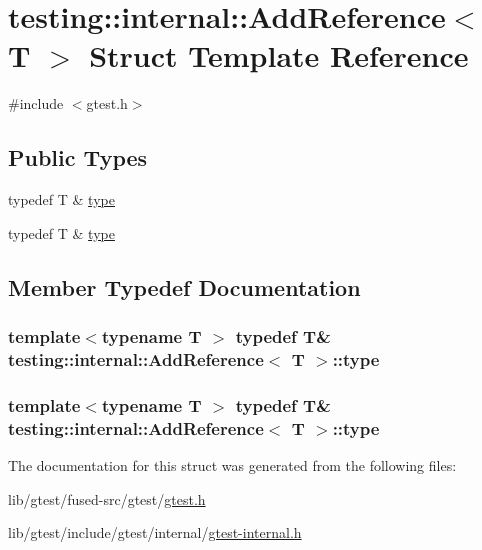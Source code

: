 \hypertarget{structtesting_1_1internal_1_1_add_reference}{\section{testing\-:\-:internal\-:\-:Add\-Reference$<$ T $>$ Struct Template Reference}
\label{structtesting_1_1internal_1_1_add_reference}
}


{\ttfamily \#include $<$gtest.\-h$>$}

\subsection*{Public Types}
\begin{DoxyCompactItemize}
\item 
typedef T \& \hyperlink{structtesting_1_1internal_1_1_add_reference_a2df8dd7c4e41f6390e6e66b1a9a67bb4}{type}
\item 
typedef T \& \hyperlink{structtesting_1_1internal_1_1_add_reference_a2df8dd7c4e41f6390e6e66b1a9a67bb4}{type}
\end{DoxyCompactItemize}


\subsection{Member Typedef Documentation}
\hypertarget{structtesting_1_1internal_1_1_add_reference_a2df8dd7c4e41f6390e6e66b1a9a67bb4}{
\subsubsection[{type}]{\setlength{\rightskip}{0pt plus 5cm}template$<$typename T $>$ typedef T\& {\bf testing\-::internal\-::\-Add\-Reference}$<$ T $>$\-::{\bf type}}}\label{structtesting_1_1internal_1_1_add_reference_a2df8dd7c4e41f6390e6e66b1a9a67bb4}
\hypertarget{structtesting_1_1internal_1_1_add_reference_a2df8dd7c4e41f6390e6e66b1a9a67bb4}{
\subsubsection[{type}]{\setlength{\rightskip}{0pt plus 5cm}template$<$typename T $>$ typedef T\& {\bf testing\-::internal\-::\-Add\-Reference}$<$ T $>$\-::{\bf type}}}\label{structtesting_1_1internal_1_1_add_reference_a2df8dd7c4e41f6390e6e66b1a9a67bb4}


The documentation for this struct was generated from the following files\-:\begin{DoxyCompactItemize}
\item 
lib/gtest/fused-\/src/gtest/\hyperlink{fused-src_2gtest_2gtest_8h}{gtest.\-h}\item 
lib/gtest/include/gtest/internal/\hyperlink{gtest-internal_8h}{gtest-\/internal.\-h}\end{DoxyCompactItemize}

